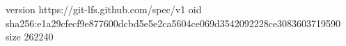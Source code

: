 version https://git-lfs.github.com/spec/v1
oid sha256:e1a29cfecf9e877600dcbd5e5e2ca5604ce069d3542092228ce3083603719590
size 262240
